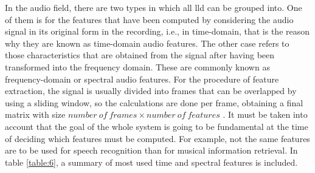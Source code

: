 	In the audio field, there are two types in which all \acrshort{lld} can be grouped into. One of them is for the features that have been computed by considering the audio signal in its original form in the recording, i.e., in time-domain, that is the reason why they are known as time-domain audio features. The other case refers to those characteristics that are obtained from the signal after having been transformed into the frequency domain. These are commonly known as frequency-domain or spectral audio features. For the procedure of feature extraction, the signal is usually divided into frames that can be overlapped by using a sliding window, so the calculations are done per frame, obtaining a final matrix with size $number\ of\ frames \times number\ of\ features$ \cite{Giannakopoulos2014}. It must be taken into account that the goal of the whole system is going to be fundamental at the time of deciding which features must be computed. For example, not the same features are to be used for speech recognition than for musical information retrieval. In table \ref{table:6}, a summary of most used time and spectral features is included.
	
